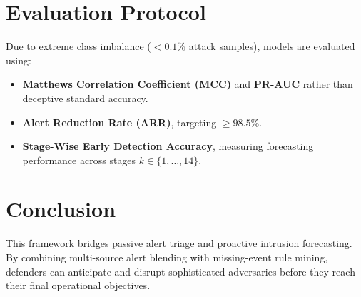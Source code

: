 \documentclass[11pt,a4paper]{article}
\begin{document}
\section{Evaluation Protocol}
Due to extreme class imbalance ($<0.1\%$ attack samples), models are evaluated using:
\begin{itemize}
    \item \textbf{Matthews Correlation Coefficient (MCC)} and \textbf{PR-AUC} rather than deceptive standard accuracy.
    \item \textbf{Alert Reduction Rate (ARR)}, targeting $\ge 98.5\%$.
    \item \textbf{Stage-Wise Early Detection Accuracy}, measuring forecasting performance across stages $k \in \{1, \dots, 14\}$.
\end{itemize}

\section{Conclusion}
This framework bridges passive alert triage and proactive intrusion forecasting. By combining multi-source alert blending with missing-event rule mining, defenders can anticipate and disrupt sophisticated adversaries before they reach their final operational objectives.
\end{document}
